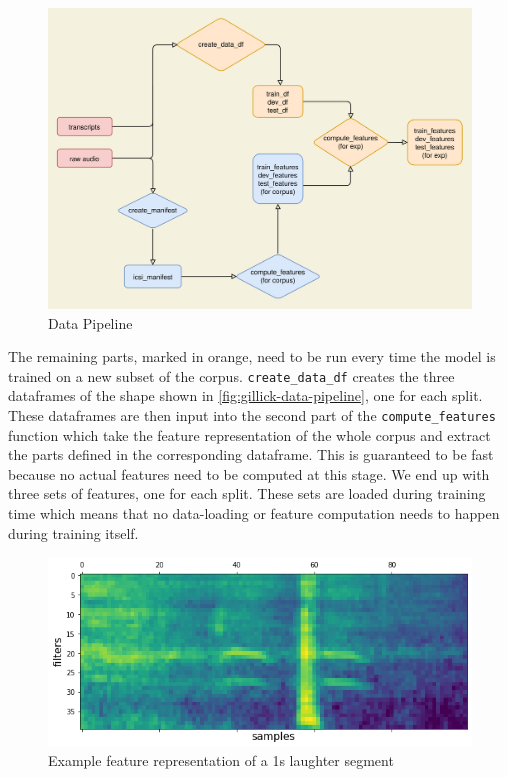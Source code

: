 \documentclass[bsc,frontabs,parskip,deptreport]{infthesis}
\begin{document}
\begin{figure}[h!]
    \centering
    \includegraphics[width=15cm]{imgs/diagrams/Pipeline.drawio.png}
    \caption{Data Pipeline}
    \label{fig:data-pipeline}
\end{figure}

The remaining parts, marked in orange, need to be run every time the model is trained on a new subset of the corpus.
\verb|create_data_df| creates the three dataframes of the shape shown in \autoref{fig:gillick-data-pipeline}, one for each split.
These dataframes are then input into the second part of the \verb|compute_features| function which take the feature representation of the whole corpus and extract the parts defined in the corresponding dataframe. This is guaranteed to be fast because no actual features need to be computed at this stage.
We end up with three sets of features, one for each split. 
These sets are loaded during training time which means that no data-loading or feature computation needs to happen during training itself.

\begin{figure}[h!]
    \centering
    \includegraphics[width=14cm]{imgs/sample_fbank_feat.png}
    \caption{Example feature representation of a 1s laughter segment}
    \label{fig:feature-sample}
\end{figure}
\end{document}
